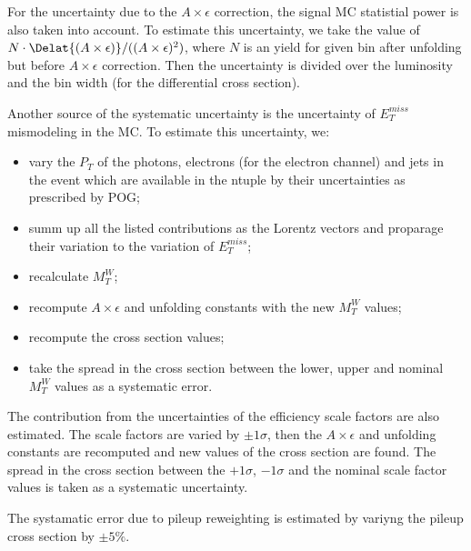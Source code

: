 
For the uncertainty due to the $A \times \epsilon$ correction, the signal MC statistial power is also taken into account. To estimate this uncertainty, we take the value of $N \cdot \Delat{(A\times \epsilon)} / ((A\times \epsilon)^2)$, where $N$ is an yield for given bin after unfolding but before $A \times \epsilon$ correction. Then the uncertainty is divided over the luminosity and the bin width (for the differential cross section).


Another source of the systematic uncertainty is the uncertainty of $E_T^{miss}$ mismodeling in the MC. To estimate this uncertainty, we:
\begin{itemize}
  \item vary the $P_T$ of the photons, electrons (for the electron channel) and jets in the event which are available in the ntuple by their uncertainties as prescribed by POG;
  \item summ up all the listed contributions as the Lorentz vectors and proparage their variation to the variation of $E_T^{miss}$;
  \item recalculate $M_T^{W}$;
  \item recompute $A \times \epsilon$ and unfolding constants with the new $M_T^{W}$ values;
  \item recompute the cross section values;
  \item take the spread in the cross section between the lower, upper and nominal $M_T^{W}$ values as a systematic error.
\end{itemize}


The contribution from the uncertainties of the efficiency scale factors are also estimated. The scale factors are varied by $\pm 1\sigma$, then the $A \times \epsilon$ and unfolding constants are recomputed and new values of the cross section are found. The spread in the cross section between the $+1\sigma$, $-1\sigma$ and the nominal scale factor values is taken as a systematic uncertainty.



The systamatic error due to pileup reweighting is estimated by variyng the pileup cross section by $\pm5\%$.

